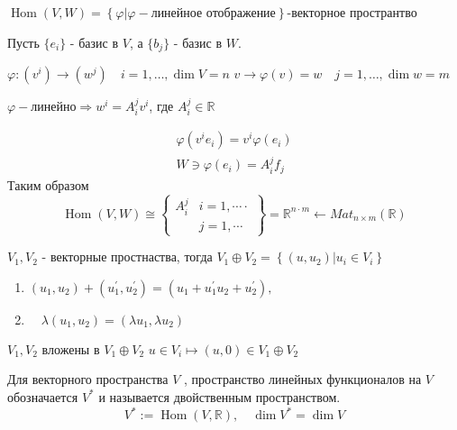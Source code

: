 $
\operatorname{Hom}(V, W)= \left\{\varphi | \varphi - \text{линейное отображение} \right\} 
$-векторное пространтво	 
\begin{exercise}
	Пусть $ \{e_i\} $ - базис в $ V $, а $\{b_j\} $ - базис в $ W $.
\end{exercise}

$\varphi :\left(v^{i}\right) \rightarrow\left(w^{j}\right) \quad i=1, \ldots, \operatorname{dim} V=n$
$v \rightarrow \varphi(v)=w \quad j=1, \ldots, \operatorname{dim} w=m$

$\varphi - \text{линейно} \Longrightarrow w^{i}=A_{i}^{j} v^{i}$, где $ A_{i}^{j} \in \mathbb{R} $

$$
\begin{array}{c}{\varphi\left(v^{i} e_{i}\right)=v^{i} \varphi\left(e_{i}\right)} \\ {W \ni \varphi\left(e_{i}\right)=A_{i}^{j} f_{j}}\end{array}
$$
Таким образом 
$$
\operatorname{Hom}(V, W) \cong 
\left\{\begin{array}{ll}{A_{i}^{j}}  &i=1, \cdots \cdot \\ & j=1, \cdots \end{array}\right\} = \mathbb{R}^{n \cdot m} \longleftarrow M a t_{n \times m}(\mathbb{R})
$$

\begin{definition}
	$V_1, V_2$ - векторные простнаства, тогда $V_{1} \oplus V_{2}=\left\{\left(u, u_{2}\right) | u_{i} \in V_{i}\right\}$
	

	\begin{enumerate}
		\item 
		$\left(u_{1}, u_{2}\right)+\left(u_{1}^{\prime}, u_{2}^{\prime}\right)=\left(u_{1}+u_{1}^{\prime}\right.
		\left.u_{2}+u_{2}^{\prime}\right),$
		\item 
		$ \quad \lambda\left(u_{1}, u_{2}\right)=\left(\lambda u_{1}, \lambda u_{2}\right) $
	\end{enumerate}

\end{definition}

$V_{1}, V_{2}$ вложены в $V_{1} \oplus V_{2}$ $ u \in V_i \longmapsto(u, 0) \in V_{1} \oplus V_{2} $

\begin{definition}
	Для векторного пространства $ V $ , пространство линейных функционалов на $ V $ обозначается $ V^{*}$ и называется двойственным пространством. 
	$$V^{*} :=\operatorname{Hom}(V, \mathbb{R}), \quad \operatorname{dim} V^{*}=\operatorname{dim} V $$
\end{definition}

